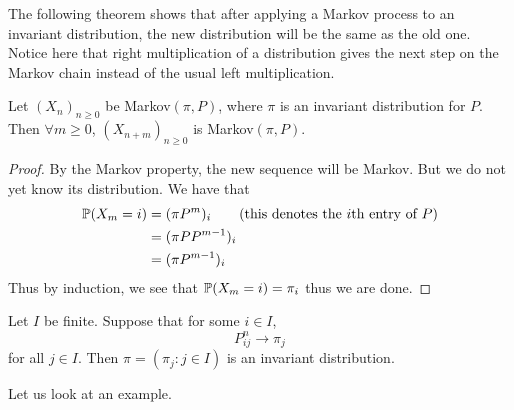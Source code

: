 \documentclass[a4paper]{article}
\begin{document}
The following theorem shows that after applying a Markov process to an invariant distribution, the new distribution will be the same as the old one. Notice here that right multiplication of a distribution gives the next step on the Markov chain instead of the usual left multiplication. 

\begin{thm}{}{} Let $(X_n)_{n\geq 0}$ be Markov$(\pi,P)$, where $\pi$ is an invariant distribution for $P$. Then $\forall m\geq 0$, $(X_{n+m})_{n\geq 0}$ is Markov$(\pi,P)$. \tcbline
\begin{proof}
By the Markov property, the new sequence will be Markov. But we do not yet know its distribution. We have that 
\begin{align*}
\mathbb{P}(X_m=i)&=(\pi P^m)_i\tag{this denotes the $i$th entry of $P$}\\
&=(\pi PP^{m-1})_i\\
&=(\pi P^{m-1})_i
\end{align*}
Thus by induction, we see that $\mathbb{P}(X_m=i)=\pi_i$ thus we are done. 
\end{proof}
\end{thm}

\begin{thm}{}{} Let $I$ be finite. Suppose that for some $i\in I$, $$P_{ij}^n\to\pi_j$$ for all $j\in I$. Then $\pi=(\pi_j:j\in I)$ is an invariant distribution. 
\end{thm}

Let us look at an example. 
\end{document}
